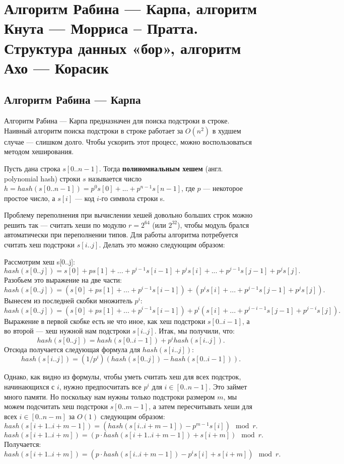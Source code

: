 \section{Алгоритм Рабина --- Карпа, алгоритм Кнута --- Морриса -- Пратта.  Структура данных «бор», алгоритм Ахо --- Корасик}

\subsection{Алгоритм Рабина --- Карпа}

Алгоритм Рабина --- Карпа предназначен для поиска подстроки в строке.
Наивный алгоритм поиска подстроки в строке работает за $O(n^2)$ в худшем случае --- слишком долго.
Чтобы ускорить этот процесс, можно воспользоваться методом хеширования.

\begin{definition}
    Пусть дана строка $s[0..n-1]$. Тогда \textbf{полиномиальным хешем} (англ. polynomial hash) строки $s$ называется число $h=hash(s[0..n-1])=p^0 s[0]+...+p^{n-1}s[n-1]$, где $p$ --- некоторое простое число, а $s[i]$ --- код $i$-го символа строки s.
\end{definition}

Проблему переполнения при вычислении хешей довольно больших строк можно решить так --- считать хеши по модулю $r=2^{64}$ (или $2^{32}$), чтобы модуль брался автоматически при переполнении типов.
Для работы алгоритма потребуется считать хеш подстроки $s[i..j]$.
Делать это можно следующим образом:

Рассмотрим хеш s[0..j]: $$hash(s[0..j])=s[0]+ps[1]+...+p^{i-1}s[i-1]+p^is[i]+...+p^{j-1}s[j-1]+p^js[j].$$
Разобьем это выражение на две части: $$hash(s[0..j])=(s[0]+ps[1]+...+p^{i-1}s[i-1])+(p^is[i]+...+p^{j-1}s[j-1]+p^js[j]).$$
Вынесем из последней скобки множитель $p^i$: $$hash(s[0..j])=(s[0]+ps[1]+...+p^{i-1}s[i-1])+p^i(s[i]+...+p^{j-i-1}s[j-1]+p^{j-i}s[j]).$$
Выражение в первой скобке есть не что иное, как хеш подстроки $s[0..i-1]$, а во второй --- хеш нужной нам подстроки $s[i..j]$.
Итак, мы получили, что: $$hash(s[0..j])=hash(s[0..i-1])+p^ihash(s[i..j]).$$
Отсюда получается следующая формула для $hash(s[i..j])$: $$hash(s[i..j])=(1/p^i)(hash(s[0..j])-hash(s[0..i-1])).$$

Однако, как видно из формулы, чтобы уметь считать хеш для всех подстрок, начинающихся с $i$, нужно предпосчитать все $p^i$ для $i \in [0..n-1]$.
Это займет много памяти.
Но поскольку нам нужны только подстроки размером $m$, мы можем подсчитать хеш подстроки $s[0..m-1]$, а затем пересчитывать хеши для всех $i \in [0..n-m]$ за $O(1)$ следующим образом: $$hash(s[i+1..i+m-1])=(hash(s[i..i+m-1])-p^{m-1}s[i])\mod r.$$
$$hash(s[i+1..i+m])=(p \cdot hash(s[i+1..i+m-1])+s[i+m])\mod r.$$
Получается: $$hash(s[i+1..i+m])=(p \cdot hash(s[i..i+m-1])-p^is[i]+s[i+m]) \mod r.$$

